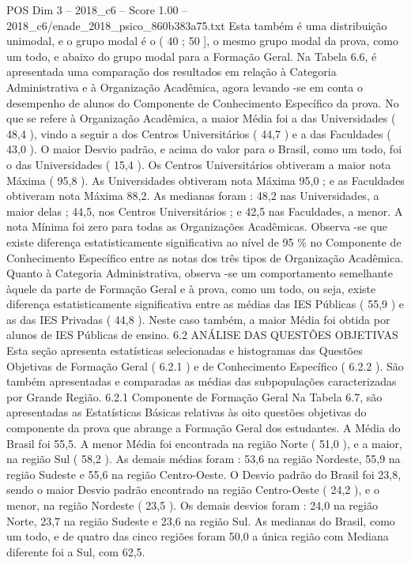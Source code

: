 \begin{textsample}{POS Dim 3 – 2018\_c6 – Score 1.00 – 2018\_c6/enade\_2018\_psico\_860b383a75.txt}
Esta também é uma distribuição unimodal, e o grupo modal é o ( 40 ; 50 ], o mesmo grupo modal da prova, como um todo, e abaixo do grupo modal para a Formação Geral.
Na Tabela 6.6, é apresentada uma comparação dos resultados em relação à Categoria Administrativa e à Organização Acadêmica, agora levando -se em conta o desempenho de alunos do Componente de Conhecimento Específico da prova.
No que se refere à Organização Acadêmica, a maior Média foi a das Universidades ( 48,4 ), vindo a seguir a dos Centros Universitários ( 44,7 ) e a das Faculdades ( 43,0 ).
O maior Desvio padrão, e acima do valor para o Brasil, como um todo, foi o das Universidades ( 15,4 ).
Os Centros Universitários obtiveram a maior nota Máxima ( 95,8 ).
As Universidades obtiveram nota Máxima 95,0 ; e as Faculdades obtiveram nota Máxima 88,2.
As medianas foram : 48,2 nas Universidades, a maior delas ; 44,5, nos Centros Universitários ; e 42,5 nas Faculdades, a menor.
A nota Mínima foi zero para todas as Organizações Acadêmicas.
Observa -se que existe diferença estatisticamente significativa ao nível de 95 \% no Componente de Conhecimento Específico entre as notas dos três tipos de Organização Acadêmica.
Quanto à Categoria Administrativa, observa -se um comportamento semelhante àquele da parte de Formação Geral e à prova, como um todo, ou seja, existe diferença estatisticamente significativa entre as médias das IES Públicas ( 55,9 ) e as das IES Privadas ( 44,8 ).
Neste caso também, a maior Média foi obtida por alunos de IES Públicas de ensino. 6.2 ANÁLISE DAS QUESTÕES OBJETIVAS Esta seção apresenta estatísticas selecionadas e histogramas das Questões Objetivas de Formação Geral ( 6.2.1 ) e de Conhecimento Específico ( 6.2.2 ).
São também apresentadas e comparadas as médias das subpopulações caracterizadas por Grande Região. 6.2.1 Componente de Formação Geral Na Tabela 6.7, são apresentadas as Estatísticas Básicas relativas às oito questões objetivas do componente da prova que abrange a Formação Geral dos estudantes.
A Média do Brasil foi 55,5.
A menor Média foi encontrada na região Norte ( 51,0 ), e a maior, na região Sul ( 58,2 ).
As demais médias foram : 53,6 na região Nordeste, 55,9 na região Sudeste e 55,6 na região Centro-Oeste.
O Desvio padrão do Brasil foi 23,8, sendo o maior Desvio padrão encontrado na região Centro-Oeste ( 24,2 ), e o menor, na região Nordeste ( 23,5 ).
Os demais desvios foram : 24,0 na região Norte, 23,7 na região Sudeste e 23,6 na região Sul.
As medianas do Brasil, como um todo, e de quatro das cinco regiões foram 50,0 a única região com Mediana diferente foi a Sul, com 62,5.

\end{textsample}
